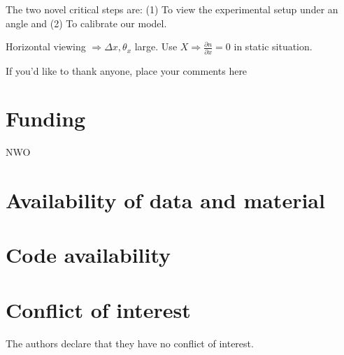 \documentclass{svjour3}                     %
\begin{document}
The two novel critical steps are: (1) To view the experimental setup under an angle and (2) To calibrate our model. 

Horizontal viewing $\Rightarrow \Delta x, \theta_x$ large. Use $X \Rightarrow \frac{\partial n}{\partial x} = 0$ in static situation.
\begin{acknowledgements}
If you'd like to thank anyone, place your comments here
\end{acknowledgements}

\section*{Funding}
NWO

\section*{Availability of data and material}

\section*{Code availability}

%
 \section*{Conflict of interest}
 The authors declare that they have no conflict of interest.

\printbibliography[heading=bibintoc]

%
%
\end{document}
